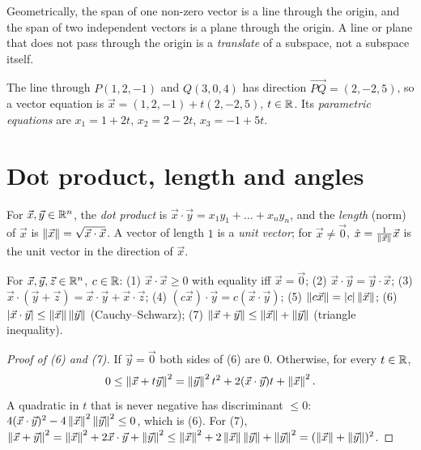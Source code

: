 Geometrically, the span of one non-zero vector is a line through the origin, and the span
of two independent vectors is a plane through the origin. A line or plane that does not
pass through the origin is a \emph{translate} of a subspace, not a subspace itself.

\begin{example}
The line through $P(1,2,-1)$ and $Q(3,0,4)$ has direction $\vec{PQ}=(2,-2,5)$, so a vector
equation is $\vec x = (1,2,-1) + t(2,-2,5)$, $t\in\mathbb{R}$. Its \emph{parametric equations} are
$x_1=1+2t$, $x_2=2-2t$, $x_3=-1+5t$.
\end{example}

\section{Dot product, length and angles}

\begin{definition}
For $\vec x,\vec y\in\mathbb{R}^n$, the \emph{dot product} is
$\vec x\cdot\vec y = x_1y_1+\dots+x_ny_n$, and the \emph{length} (norm) of $\vec x$ is
$\left\lVert \vec x \right\rVert=\sqrt{\vec x\cdot\vec x}$. A vector of length $1$ is a \emph{unit vector};
for $\vec x\neq\vec 0$, $\hat x = \frac{1}{\left\lVert \vec x \right\rVert}\vec x$ is the unit vector in the
direction of $\vec x$.
\end{definition}

\begin{theorem}
For $\vec x,\vec y,\vec z\in\mathbb{R}^n$, $c\in\mathbb{R}$:
(1) $\vec x\cdot\vec x\ge0$ with equality iff $\vec x=\vec 0$;
(2) $\vec x\cdot\vec y=\vec y\cdot\vec x$;
(3) $\vec x\cdot(\vec y+\vec z)=\vec x\cdot\vec y+\vec x\cdot\vec z$;
(4) $(c\vec x)\cdot\vec y = c(\vec x\cdot\vec y)$;
(5) $\left\lVert c\vec x \right\rVert=\left\lvert c \right\rvert\left\lVert \vec x \right\rVert$;
(6) $\left\lvert \vec x\cdot\vec y \right\rvert\le\left\lVert \vec x \right\rVert\left\lVert \vec y \right\rVert$ (Cauchy--Schwarz);
(7) $\left\lVert \vec x+\vec y \right\rVert\le\left\lVert \vec x \right\rVert+\left\lVert \vec y \right\rVert$ (triangle inequality).
\end{theorem}
\begin{proof}[Proof of (6) and (7)]
If $\vec y=\vec 0$ both sides of (6) are $0$. Otherwise, for every $t\in\mathbb{R}$,
\[
0\le \left\lVert \vec x+t\vec y \right\rVert^2 = \left\lVert \vec y \right\rVert^2t^2 + 2(\vec x\cdot\vec y)t + \left\lVert \vec x \right\rVert^2 .
\]
A quadratic in $t$ that is never negative has discriminant $\le0$:
$4(\vec x\cdot\vec y)^2-4\left\lVert \vec x \right\rVert^2\left\lVert \vec y \right\rVert^2\le0$, which is (6). For (7),
$\left\lVert \vec x+\vec y \right\rVert^2=\left\lVert \vec x \right\rVert^2+2\vec x\cdot\vec y+\left\lVert \vec y \right\rVert^2\le
\left\lVert \vec x \right\rVert^2+2\left\lVert \vec x \right\rVert\left\lVert \vec y \right\rVert+\left\lVert \vec y \right\rVert^2=(\left\lVert \vec x \right\rVert+\left\lVert \vec y \right\rVert)^2$.
\end{proof}

